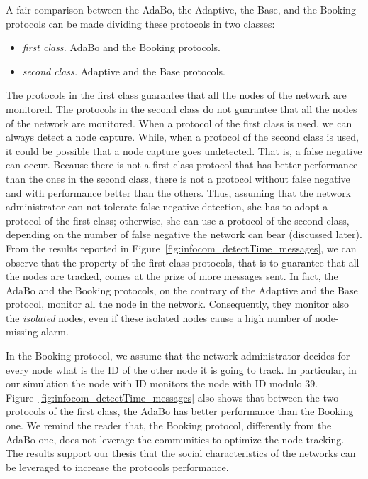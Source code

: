 \documentclass{IEEEconf}
\begin{document}
A fair comparison between the AdaBo, the Adaptive, the Base, and the Booking protocols can be made dividing these protocols in two classes:
\begin{itemize}
\item \textit{first class.} AdaBo and the Booking protocols.
\item \textit{second class.} Adaptive and the Base protocols.
\end{itemize}
The protocols in the first class guarantee that all the nodes of the network are monitored. The protocols in the second class do not guarantee that all the nodes of the network are monitored. When a protocol of the first class is used, we can always detect a node capture. While, when a protocol of the second class is used, it could be possible that a node capture goes undetected. That is, a false negative can occur. Because there is not a first class protocol that has better performance than the ones in the second class, there is not a protocol without false negative and with performance better than the others. Thus, assuming that the network administrator can not tolerate false negative detection, she has to adopt a protocol of the first class; otherwise, she can use a protocol of the second class, depending on the number of false negative the network can bear (discussed later). From the results reported in Figure~\ref{fig:infocom_detectTime_messages}, we can observe that the property of the first class protocols, that is to guarantee that all the nodes are tracked, comes at the prize of more messages sent. In fact, the AdaBo and the Booking protocols, on the contrary of the Adaptive and the Base protocol, monitor all the node in the network. Consequently, they monitor also the \textit{isolated} nodes, even if these isolated nodes cause a high number of node-missing alarm.

In the Booking protocol, we assume that the network administrator decides for every node what is the ID of the other node it is going to track. In particular, in our simulation the node with ID  monitors the node with ID  modulo 39. Figure~\ref{fig:infocom_detectTime_messages} also shows that between the two protocols of the first class, the AdaBo has better performance than the Booking one. We remind the reader that, the Booking protocol, differently from the AdaBo one, does not leverage the communities to optimize the node tracking. The results support our thesis that the social characteristics of the networks can be leveraged to increase the protocols performance.
\end{document}

